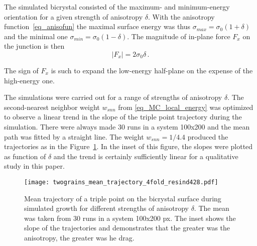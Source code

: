 The simulated bicrystal consisted of the maximum- and minimum-energy orientation for a given strength of anisotropy $\delta$. With the anisotropy function~\eqref{eq_anisofun} the maximal surface energy was thus $\sigma_{max}=\sigma_0(1+\delta)$ and the minimal one $\sigma_{min}=\sigma_0(1-\delta)$. The magnitude of in-plane force $F_x$ on the junction is then 
\begin{equation}
	|F_x| = 2\sigma_0\delta \,.
\end{equation}

The sign of $F_x$ is such to expand the low-energy half-plane on the expense of the high-energy one.

The simulations were carried out for a range of strengths of anisotropy $\delta$. The second-nearest neighbor weight $w_{snn}$ from \eqref{eq_MC_local_energy} was optimized to observe a linear trend in the slope of the triple point trajectory during the simulation. There were always made 30 runs in a system 100x200 and the mean path was fitted by a straight line. The weight $w_{snn}=1/4.4$ produced the trajectories as in the Figure~\ref{fig_MC_bicrystal_validation}. In the inset of this figure, the slopes were plotted as function of $\delta$ and the trend is certainly sufficiently linear for a qualitative study in this paper.

\begin{figure}
	\centering
	\texttt{[image: twograins\_mean\_trajectory\_4fold\_resind428.pdf]}
	\caption[MC algorithm validation - mean trajectory of a triple point on the bicrystal surface]{Mean trajectory of a triple point on the bicrystal surface during simulated growth for different strengths of anisotropy $\delta$. The mean was taken from 30 runs in a system 100x200 px. The inset shows the slope of the trajectories and demonstrates that the greater was the anisotropy, the greater was he drag.}
	\label{fig_MC_bicrystal_validation}
\end{figure}

